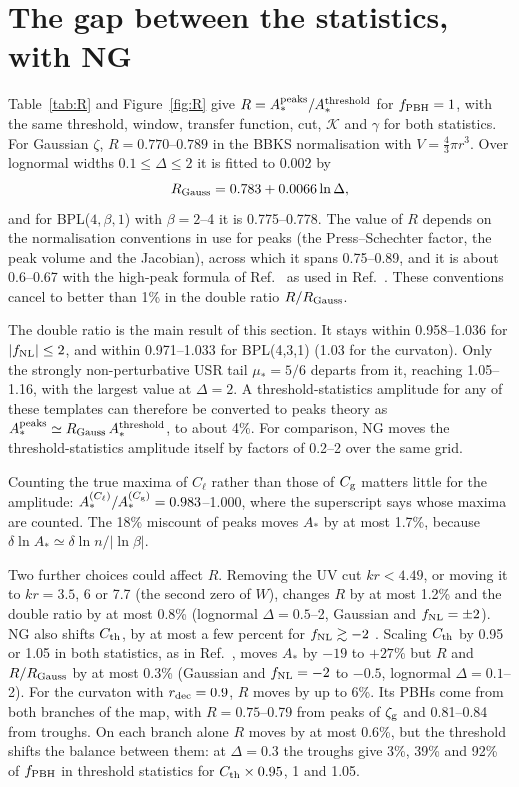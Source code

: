 \documentclass{article}
\newcommand{\Cg}{C_{\rm g}}
\newcommand{\Cl}{C_{\ell}}
\newcommand{\zg}{\zeta_{\rm g}}
\newcommand{\fnl}{f_{\rm NL}}
\newcommand{\fpbh}{f_{\rm PBH}}
\begin{document}
\section{The gap between the statistics, with NG}\label{sec:R}

Table~\ref{tab:R} and Figure~\ref{fig:R} give $R=A_*^{\rm peaks}/A_*^{\rm threshold}$ for
$\fpbh=1$, with the same threshold, window, transfer function, cut, $\mathcal K$ and $\gamma$ for
both statistics. For Gaussian $\zeta$, $R=0.770$--$0.789$ in the BBKS normalisation with
$V=\frac43\pi r^3$. Over lognormal widths $0.1\le\Delta\le2$ it is fitted to 0.002 by
\begin{equation}
R_{\rm Gauss}=0.783+0.0066\ln\Delta,
\label{eq:RGauss}
\end{equation}
and for BPL($4,\beta,1$) with $\beta=2$--4 it is 0.775--0.778. The value of $R$ depends on the
normalisation conventions in use for peaks (the Press--Schechter factor, the peak volume and the
Jacobian), across which it spans 0.75--0.89, and it is about 0.6--0.67 with the high-peak formula
of Ref.~\cite{Iovino24} as used in Ref.~\cite{Blas26}. These conventions cancel to better than 1\%
in the double ratio $R/R_{\rm Gauss}$.

The double ratio is the main result of this section. It stays within 0.958--1.036 for
$|\fnl|\le2$, and within 0.971--1.033 for BPL(4,3,1) (1.03 for the curvaton). Only the strongly
non-perturbative USR tail $\mu_*=5/6$ departs from it, reaching 1.05--1.16, with the largest
value at $\Delta=2$. A threshold-statistics amplitude for any of these templates can therefore be
converted to peaks theory as $A_*^{\rm peaks}\simeq R_{\rm Gauss}\,A_*^{\rm threshold}$, to about
4\%. For comparison, NG moves the threshold-statistics amplitude itself by factors of 0.2--2 over
the same grid.

Counting the true maxima of $\Cl$ rather than those of $\Cg$ matters little for the amplitude:
$A_*^{(\Cl)}/A_*^{(\Cg)}=0.983$--1.000, where the superscript says whose maxima are counted. The
18\% miscount of peaks moves $A_*$ by at most 1.7\%, because $\delta\ln A_*\simeq\delta\ln n/|\ln\beta|$.

Two further choices could affect $R$. Removing the UV cut $kr<4.49$, or moving it to $kr=3.5$, 6
or 7.7 (the second zero of $W$), changes $R$ by at most 1.2\% and the double ratio by at most
0.8\% (lognormal $\Delta=0.5$--2, Gaussian and $\fnl=\pm2$). NG also shifts $C_{\rm th}$, by at most
a few percent for $\fnl\gtrsim-2$ \cite{KMR19,ETYY22,Iovino24}. Scaling $C_{\rm th}$ by 0.95 or 1.05
in both statistics, as in Ref.~\cite{Iovino24}, moves $A_*$ by $-19$ to $+27\%$ but $R$ and
$R/R_{\rm Gauss}$ by at most 0.3\% (Gaussian and $\fnl=-2$ to $-0.5$, lognormal $\Delta=0.1$--2).
For the curvaton with $r_{\rm dec}=0.9$, $R$ moves by up to 6\%. Its PBHs come from both branches
of the map, with $R=0.75$--0.79 from peaks of $\zg$ and 0.81--0.84 from troughs. On each branch
alone $R$ moves by at most 0.6\%, but the threshold shifts the balance between them: at
$\Delta=0.3$ the troughs give 3\%, 39\% and 92\% of $\fpbh$ in threshold statistics for
$C_{\rm th}\times0.95$, 1 and 1.05.
\end{document}
